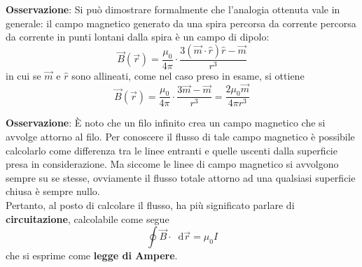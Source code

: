 \documentclass[a4paper]{extarticle}
\newcommand\dif{\mathop{}\!\mathrm{d}}
\begin{document}
\vspace{2em}
\noindent
\textbf{Osservazione}: Si può dimostrare formalmente che l'analogia ottenuta vale in generale: il campo magnetico generato da una spira percorsa da corrente percorsa da corrente in punti lontani dalla spira è un campo di dipolo:
\[\boxed{\vec B (\vec r) = \dfrac{\mu_0}{4 \pi} \cdot \dfrac{3 (\vec m \cdot \hat r) \hat r - \vec m}{r^3}}\]
in cui se $\vec m$ e $\hat r$ sono allineati, come nel caso preso in esame, si ottiene
\[\vec B(\vec r) = \dfrac{\mu_0}{4 \pi} \cdot \dfrac{3 \vec m - \vec m}{r^3} = \dfrac{2 \mu_0 \vec m}{4 \pi r^3}\]

\vspace{2em}
\noindent
\textbf{Osservazione}: È noto che un filo infinito crea un campo magnetico che si avvolge attorno al filo. Per conoscere il flusso di tale campo magnetico è possibile calcolarlo come differenza tra le linee entranti e quelle uscenti dalla superficie presa in considerazione. Ma siccome le linee di campo magnetico si avvolgono sempre su se stesse, ovviamente il flusso totale attorno ad una qualsiasi superficie chiusa è sempre nullo.\\
Pertanto, al posto di calcolare il flusso, ha più significato parlare di \textbf{circuitazione}, calcolabile come segue
\[\oint \vec B \cdot \dif \vec r = \mu_0 I\]
che si esprime come \textbf{legge di Ampere}.
\end{document}
